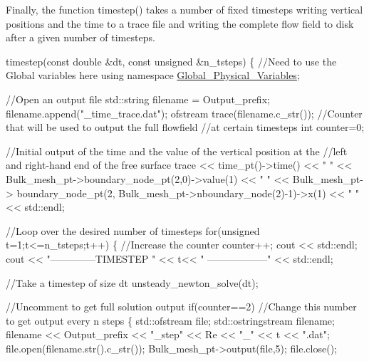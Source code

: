 Finally, the function {\ttfamily timestep()} takes a number of fixed timesteps writing vertical positions and the time to a trace file and writing the complete flow field to disk after a given number of timesteps. 
\begin{DoxyCodeInclude}
timestep(\textcolor{keyword}{const} \textcolor{keywordtype}{double} &dt, \textcolor{keyword}{const} \textcolor{keywordtype}{unsigned} &n\_tsteps)
\{
 \textcolor{comment}{//Need to use the Global variables here}
 \textcolor{keyword}{using namespace }\hyperlink{namespaceGlobal__Physical__Variables}{Global\_Physical\_Variables};
 
 \textcolor{comment}{//Open an output file}
 std::string filename = Output\_prefix;
 filename.append(\textcolor{stringliteral}{"\_time\_trace.dat"});
 ofstream trace(filename.c\_str()); 
 \textcolor{comment}{//Counter that will be used to output the full flowfield}
 \textcolor{comment}{//at certain timesteps}
 \textcolor{keywordtype}{int} counter=0; 
 
 \textcolor{comment}{//Initial output of the time and the value of the vertical position at the}
 \textcolor{comment}{//left and right-hand end of the free surface}
 trace << time\_pt()->time() << \textcolor{stringliteral}{" "} 
       << Bulk\_mesh\_pt->boundary\_node\_pt(2,0)->value(1) 
       << \textcolor{stringliteral}{" "}
       <<  Bulk\_mesh\_pt->
  boundary\_node\_pt(2, Bulk\_mesh\_pt->nboundary\_node(2)-1)->x(1) 
       << \textcolor{stringliteral}{" "}
       << std::endl;
 
 \textcolor{comment}{//Loop over the desired number of timesteps}
 \textcolor{keywordflow}{for}(\textcolor{keywordtype}{unsigned} t=1;t<=n\_tsteps;t++)
  \{
   \textcolor{comment}{//Increase the counter}
   counter++;
   cout << std::endl;
   cout << \textcolor{stringliteral}{"--------------TIMESTEP "} << t<< \textcolor{stringliteral}{" ------------------"} << std::endl;
   
   \textcolor{comment}{//Take a timestep of size dt}
   unsteady\_newton\_solve(dt);
   
   \textcolor{comment}{//Uncomment to get full solution output}
   \textcolor{keywordflow}{if}(counter==2) \textcolor{comment}{//Change this number to get output every n steps}
    \{
     std::ofstream file;
     std::ostringstream filename;
     filename << Output\_prefix << \textcolor{stringliteral}{"\_step"} << Re << \textcolor{stringliteral}{"\_"} << t << \textcolor{stringliteral}{".dat"};
     file.open(filename.str().c\_str());
     Bulk\_mesh\_pt->output(file,5);
     file.close();
     

\end{DoxyCodeInclude}
